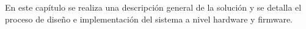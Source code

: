 En este capítulo se realiza una descripción general de la solución y se detalla el proceso de diseño e implementación del sistema a nivel hardware y firmware. 